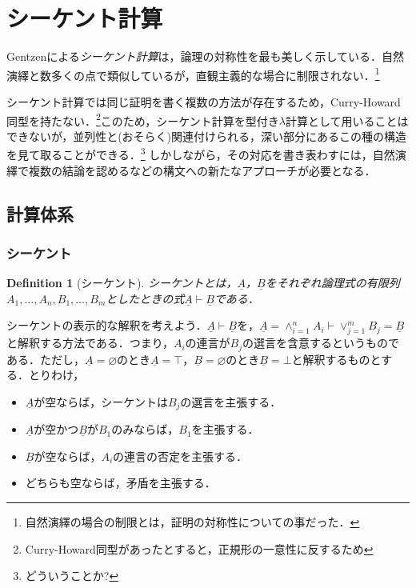 \documentclass[a4paper,10pt,platex, dvipdfmx]{jsarticle}
\newtheorem{definition}{Definition}
\begin{document}
\section{シーケント計算}
Gentzenによる\emph{シーケント計算}は，論理の対称性を最も美しく示している．自然演繹と数多くの点で類似しているが，直観主義的な場合に制限されない．\footnote{自然演繹の場合の制限とは，証明の対称性についての事だった．}

シーケント計算では同じ証明を書く複数の方法が存在するため，Curry-Howard同型を持たない．\footnote{Curry-Howard同型があったとすると，正規形の一意性に反するため}このため，シーケント計算を型付き$\lambda$計算として用いることはできないが，並列性と(おそらく)関連付けられる，深い部分にあるこの種の構造を見て取ることができる．\footnote{どういうことか?}
しかしながら，その対応を書き表わすには，自然演繹で複数の結論を認めるなどの構文への新たなアプローチが必要となる．

\subsection{計算体系}
\subsubsection{シーケント}
\begin{definition}[シーケント]
\emph{シーケント}とは，$\underline{A}$，$\underline{B}$をそれぞれ論理式の有限列$A_{1},\ldots,A_{n}, B_{1},\ldots,B_{m}$としたときの式$\underline{A}\vdash\underline{B}$である．
\end{definition}

シーケントの表示的な解釈を考えよう．$\underline{A}\vdash\underline{B}$を，$\underline{A} = \land_{i = 1}^{n}A_{i}\vdash\lor_{j = 1}^{m}B_{j} = \underline{B}$と解釈する方法である．つまり，$A_{i}$の連言が$B_{j}$の選言を含意するというものである．ただし，$\underline{A} = \varnothing$のとき$\underline{A} = \top$，$\underline{B} = \varnothing$のとき$\underline{B} = \bot$と解釈するものとする．とりわけ，
\begin{itemize}
\item $\underline{A}$が空ならば，シーケントは$B_{j}$の選言を主張する．
\item $\underline{A}$が空かつ$\underline{B}$が$B_{1}$のみならば，$B_{1}$を主張する．
\item $\underline{B}$が空ならば，$A_{i}$の連言の否定を主張する．
\item どちらも空ならば，矛盾を主張する．
\end{itemize}
\end{document}
